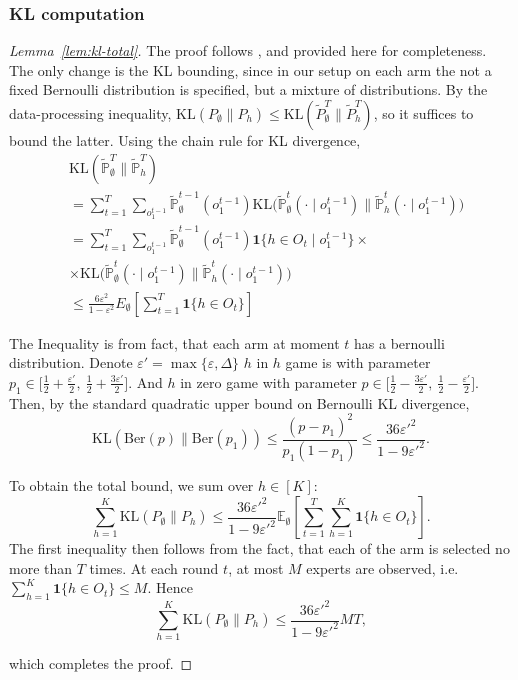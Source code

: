 \documentclass[a4paper,14pt]{extarticle}
\theoremstyle{plain}
\begin{document}
\subsubsection{KL computation}
\begin{proof}[Lemma~\ref{lem:kl-total}]
\label{lem:kl-total-proof}
The proof follows \cite{seldin2014prediction}, and provided here for completeness. The only change is the KL bounding, since in our setup on each arm the not a fixed Bernoulli distribution is specified, but a mixture of distributions.
By the data-processing inequality, $ \mathrm{KL}(P_\emptyset\|P_h)\le \mathrm{KL}(\tilde{P}_\emptyset^T\|\tilde{P}_h^T)$,
so it suffices to bound the latter.
Using the chain rule for KL divergence,
\begin{align}
&\mathrm{KL}(\tilde{\mathbb P}_\emptyset^T \| \tilde{\mathbb P}_h^T)
 \\
&= \sum_{t=1}^T
\sum_{o_1^{t-1}}
\tilde{\mathbb P}_\emptyset^{t-1}(o_1^{t-1})
\mathrm{KL}\!\Big(
\tilde{\mathbb P}_\emptyset^{t}(\cdot \mid o_1^{t-1})
\Big\|
\tilde{\mathbb P}_h^{t}(\cdot \mid o_1^{t-1})
\Big)  \\
&= \sum_{t=1}^T
\sum_{o_1^{t-1}}
\tilde{\mathbb P}_\emptyset^{t-1}(o_1^{t-1})
\mathbf 1\{h\in O_t \mid o_1^{t-1}\}\times\\
&\times
\mathrm{KL}\!\Big(
\tilde{\mathbb P}_\emptyset^{t}(\cdot \mid o_1^{t-1})
\Big\|
\tilde{\mathbb P}_h^{t}(\cdot \mid o_1^{t-1})
\Big) \\
&\le \frac{6\varepsilon^2}{1 - \varepsilon^2}  E_\emptyset\!\left[\sum_{t=1}^T \mathbf{1}\{h \in O_t\}\right]
\label{eq:kl-chainrule}
\end{align}

The Inequality is from fact, that each arm at moment $t$ has a bernoulli distribution. Denote $\varepsilon' = \max\{\varepsilon, \Delta\}$ $h$ in $h$ game is with parameter $p_1 \in \Big[\tfrac{1}{2} + \frac{\varepsilon'}{2},\ \tfrac{1}{2}+\tfrac{3\varepsilon'}{2}\Big]$. And $h$ in zero game with parameter $p \in \Big[\tfrac{1}{2}-\frac{3\varepsilon'}{2},\ \tfrac{1}{2}-\tfrac{\varepsilon'}{2}\Big]$.
Then, by the standard quadratic upper bound on Bernoulli KL divergence,
\begin{equation}
\mathrm{KL}(\mathrm{Ber}(p)\|\mathrm{Ber}(p_1))
\le \frac{(p-p_1)^2}{p_1(1-p_1)}
\le \frac{36\varepsilon'^2}{1-9\varepsilon'^2}.
\end{equation}

To obtain the total bound, we sum over $h\in[K]$:
\begin{equation*}
\sum_{h=1}^K \mathrm{KL}(P_\emptyset \| P_h)
\le
\frac{36\varepsilon'^2}{1-9\varepsilon'^2}
\mathbb E_\emptyset\!\left[\sum_{t=1}^T \sum_{h=1}^K \mathbf{1}\{h \in O_t\}\right].
\end{equation*}
The first inequality then follows from the fact, that each of the arm is selected no more than $T$ times. At each round $t$, at most $M$ experts are observed, i.e. \(\sum_{h=1}^K \mathbf{1}\{h\in O_t\}\le M\).
Hence
\begin{equation*}
\sum_{h=1}^K \mathrm{KL}(P_\emptyset \| P_h)
\le
\frac{36\varepsilon'^2}{1-9\varepsilon'^2} M T,
\end{equation*}

which completes the proof.
\end{proof}
\end{document}
